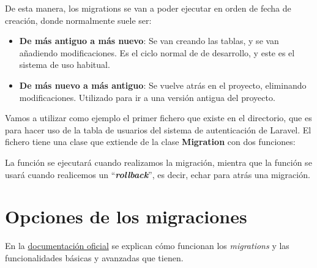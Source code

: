 De esta manera, los migrations se van a poder ejecutar en orden de fecha de creación, donde normalmente suele ser:
\begin{itemize}
    \item \textbf{De más antiguo a más nuevo}: Se van creando las tablas, y se van añadiendo modificaciones. Es el ciclo normal de de desarrollo, y este es el sistema de uso habitual.
    \item \textbf{De más nuevo a más antiguo}: Se vuelve atrás en el proyecto, eliminando modificaciones. Utilizado para ir a una versión antigua del proyecto.
\end{itemize}

Vamos a utilizar como ejemplo el primer fichero que existe en el directorio, que es para hacer uso de la tabla de usuarios del sistema de autenticación de Laravel. El fichero tiene una clase que extiende de la clase \textbf{Migration} con dos funciones:


La función  se ejecutará cuando realizamos la migración, mientra que la función  se usará cuando realicemos un “\textbf{\textit{rollback}}”, es decir, echar para atrás una migración.

\section{Opciones de los migraciones}

En la \href{https://laravel.com/docs/10.x/migrations#tables}{documentación oficial} se explican cómo funcionan los \textit{migrations} y las funcionalidades básicas y avanzadas que tienen.

